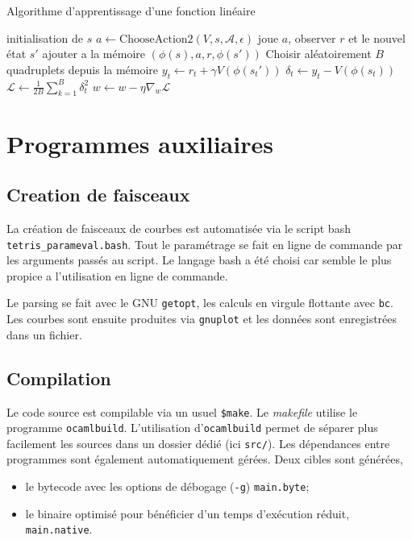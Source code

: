 \documentclass{report}
\begin{document}
\begin{algorithm}[H]
  \caption{Algorithme d'apprentissage d'une fonction linéaire}\label{alg:linfct}
  \begin{algorithmic}
    [1]
    \Repeat{}
    \State{} initialisation de \(s\)
    \Repeat{}
    \State{} \(a \gets \mathup{ChooseAction2}(V, s, \mathcal{A}, \epsilon)\)
    \State{} joue \(a\), observer \(r\) et le nouvel \'etat \(s'\)
    \State{} ajouter a la mémoire \( \left(\phi(s), a, r, \phi(s')\right) \)
    \EndFor{}
    \State{} Choisir aléatoirement \(B\) quadruplets depuis la mémoire
    \State{} \(y_t \gets r_t + \gamma V\left(\phi(s_t')\right)\)
    \State{} \(\delta_t \gets y_t - V \left(\phi(s_t)\right)\)
    \State{} \(\mathcal{L} \gets \frac{1}{2B}\sum_{k=1}^B \delta_t^2\)
    \State{} \(w \gets w - \eta \nabla_w \mathcal{L}\)
    \EndProcedure{}
  \end{algorithmic}
\end{algorithm}






\chapter{Programmes auxiliaires}
\section{Creation de faisceaux}\label{sec:faisceaux}
La création de faisceaux de courbes est automatisée via le script bash
\texttt{tetris\_parameval.bash}. Tout le paramétrage se fait en ligne de commande
par les arguments passés au script. Le langage bash a été choisi car semble le
plus propice a l'utilisation en ligne de commande.

Le parsing se fait avec le GNU \texttt{getopt}, les calculs en virgule flottante
avec \texttt{bc}. Les courbes sont ensuite produites via \texttt{gnuplot} et
les données sont enregistrées dans un fichier.



\section{Compilation}
Le code source est compilable via un usuel \texttt{\$make}. Le
\textit{makefile} utilise le programme \texttt{ocamlbuild}. L'utilisation
d'\texttt{ocamlbuild} permet de séparer plus facilement les sources dans un
dossier dédié (ici \texttt{src/}). Les dépendances entre programmes sont
également automatiquement gérées. Deux cibles sont générées,
\begin{itemize}
  \item le bytecode avec les options de débogage (\texttt{-g})
    \texttt{main.byte};
  \item le binaire optimisé pour bénéficier d'un temps d'exécution réduit,
    \texttt{main.native}.
\end{itemize}
\end{document}
